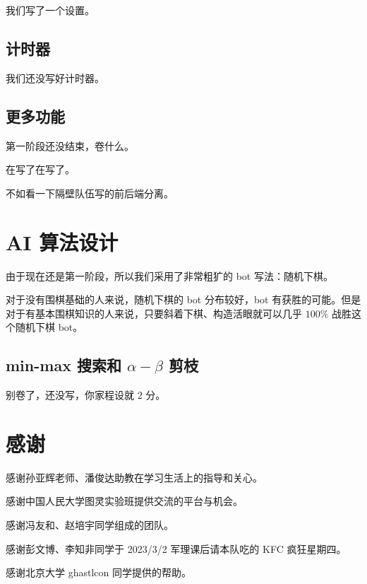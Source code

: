 \documentclass{noithesis}
\begin{document}
	我们写了一个设置。
	
	\subsection{计时器}
	
	我们还没写好计时器。
	
	\subsection{更多功能}
	
	第一阶段还没结束，卷什么。
	
	在写了在写了。
	
	不如看一下隔壁队伍写的前后端分离。
	
	\section{AI 算法设计}
	
	由于现在还是第一阶段，所以我们采用了非常粗犷的 bot 写法：随机下棋。
	
	对于没有围棋基础的人来说，随机下棋的 bot 分布较好，bot 有获胜的可能。但是对于有基本围棋知识的人来说，只要斜着下棋、构造活眼就可以几乎 $100\%$ 战胜这个随机下棋 bot。
	
	\subsection{min-max 搜索和 $\alpha-\beta$ 剪枝}
	
	别卷了，还没写，你家程设就 $2$ 分。
	
	\section{感谢}
	
	感谢孙亚辉老师、潘俊达助教在学习生活上的指导和关心。
	
	感谢中国人民大学图灵实验班提供交流的平台与机会。
	
	感谢冯友和、赵培宇同学组成的团队。
	
	感谢彭文博、李知非同学于 2023/3/2 军理课后请本队吃的 KFC 疯狂星期四。
	
	感谢北京大学 ghastlcon 同学提供的帮助。
	
\end{document}
